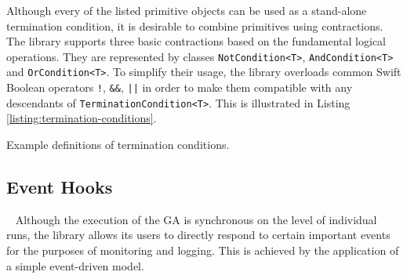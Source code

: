 Although every of the listed primitive objects can be used as a stand-alone termination condition, it is desirable to combine primitives using contractions. The library supports three basic contractions based on the fundamental logical operations. They are represented by classes \texttt{NotCondition<T>}, \texttt{AndCondition<T>} and \texttt{OrCondition<T>}. To simplify their usage, the library overloads common Swift Boolean operators \texttt{!}, \texttt{\&\&}, \texttt{||} in order to make them compatible with any descendants of \texttt{TerminationCondition<T>}. This is illustrated in Listing \ref{listing:termination-conditions}.

\begin{listing}[ht]
	\caption{Example definitions of termination conditions.}
	\label{listing:termination-conditions}
\end{listing}

\subsection{Event Hooks}~\label{section:event-hooks}
Although the execution of the GA is synchronous on the level of individual runs, the library allows its users to directly respond to certain important events for the purposes of monitoring and logging. This is achieved by the application of a simple event-driven model.

